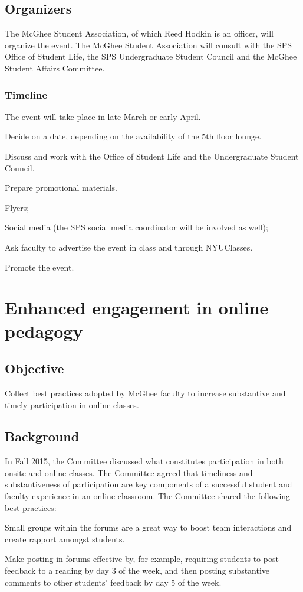 \documentclass[10pt]{meetingmins}
\begin{document}
\subsection{Organizers}
The McGhee Student Association, of which Reed Hodkin is an officer, will organize the event. The McGhee Student Association will consult with the SPS Office of Student Life, the SPS Undergraduate Student Council and the McGhee Student Affairs Committee.
\subsubsection{Timeline}
The event will take place in late March or early April.
\begin{hiddensubitems}
\item
Decide on a date, depending on the availability of the 5th floor lounge.
\item
Discuss and work with the Office of Student Life  and the Undergraduate Student Council.
\item Prepare promotional materials. 
\begin{hiddensubitems}
\item Flyers;
\item Social media (the SPS social media coordinator will be involved as well);
\item Ask faculty to advertise the event in class and through NYUClasses.
	
	\end{hiddensubitems}
	\item Promote the event.
\end{hiddensubitems}
\section{Enhanced engagement in online pedagogy}
\subsection{Objective}
Collect  best practices adopted by McGhee faculty to increase substantive and timely participation in online classes.
\subsection{Background}
In Fall 2015, the Committee discussed what constitutes participation in both onsite and online classes. The Committee agreed that timeliness and substantiveness of participation are key components of a successful student and faculty experience in an online classroom. The Committee shared the following best practices:
\begin{items}
	\item Small groups within the forums are a great way to boost team interactions and create rapport amongst students.
	\item Make posting in forums effective by, for example, requiring students to post feedback to a reading by day 3 of the week, and then posting substantive comments to other students' feedback by day 5 of the week.
	\end{items}
\end{document}

